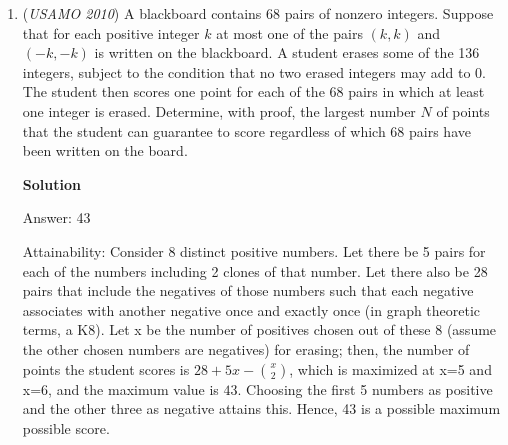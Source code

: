 \begin{enumerate}
 

 In the above sum the denominators of the fractions represent each non-zero remainder $\pmod p$ exactly once. Multiplying all the denominators yields a number $N$ that is $p-1 \pmod p$. The numerator $\pmod p$ is $N$ times the sum of the $\pmod p$ inverses of each non-zero remainder, and since this sum is $0 \pmod p$, the numerator is $0 \pmod p$. The rest of the argument is as before.

 


	\item (\textit{USAMO 2010}) A blackboard contains 68 pairs of nonzero integers.  Suppose that for each positive integer $k$ at most one of the pairs $(k, k)$ and $(-k, -k)$ is written on the blackboard.  A student erases some of the 136 integers, subject to the condition that no two erased integers may add to 0.  The student then scores one point for each of the 68 pairs in which at least one integer is erased.  Determine, with proof, the largest number $N$ of points that the student can guarantee to score regardless of which 68 pairs have been written on the board.


 



\textbf{Solution}

Answer: 43

 


 Attainability: Consider 8 distinct positive numbers. Let there be 5 pairs for each of the numbers including 2 clones of that number. Let there also be 28 pairs that include the negatives of those numbers such that each negative associates with another negative once and exactly once (in graph theoretic terms, a K8). Let x be the number of positives chosen out of these 8 (assume the other chosen numbers are negatives) for erasing; then, the number of points the student scores is $28 + 5x - {x \choose 2}$, which is maximized at x=5 and x=6, and the maximum value is $43$. Choosing the first 5 numbers as positive and the other three as negative attains this. Hence, 43 is a possible maximum possible score.

 



\end{enumerate}
